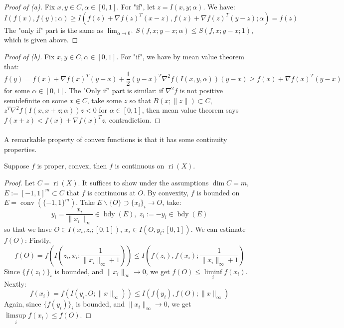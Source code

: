 \begin{proof}[Proof of (a)]
	Fix $x,y\in C,\alpha \in [0, 1]$. For "if", let $z=I(x,y; \alpha )$. We have:
	\[
		I(f(x),f(y);\alpha )  \geq I(f(z)+\nabla f(z)^T(x-z),f(z)+\nabla f(z)^T(y-z);\alpha ) = f(z)
	\]
	The "only if" part is the same as $\lim_{\alpha \to0^+}S(f,x; y-x; \alpha )\leq S(f,x; y-x; 1)$, which is given above.
\end{proof}
\begin{proof}[Proof of (b)]
	Fix $x,y\in C,\alpha \in [0, 1]$. For "if", we have by mean value theorem that:
	\[
		f(y)=f(x)+\nabla f(x)^T(y-x)+\frac{1}{2}(y-x)^T\nabla^2f(I(x,y,\alpha ))(y-x)\geq f(x)+\nabla f(x)^T(y-x)
	\]
	for some $\alpha \in[0,1]$. The "Only if" part is similar: if $\nabla^2 f$ is not positive semidefinite on some $x\in C$, take some $z$ so that $B(x;\|z\|)\subset C$, $z^T\nabla^2f(I(x, x+z;\alpha))z<0$ for $\alpha\in[0,1]$, then mean value theorem says $f(x+z)<f(x)+\nabla f(x)^Tz$, contradiction.
\end{proof}

\paragraph{}A remarkable property of convex functions is that it has some continuity properties.

\begin{prop}
	\label{prop:022-continuity}
	Suppose $f$ is proper, convex, then $f$ is continuous on $\operatorname{ri}(X)$.
\end{prop}

\begin{proof}
	Let $C=\operatorname{ri}(X)$. It suffices to show under the assumptions $\dim C=m$, $E:=[-1,1]^m\subset C$ that $f$ is continuous at $O$. By convexity, $f$ is bounded on $E=\operatorname{conv}(\{-1,1\}^m)$. Take $E\smallsetminus\{O\}\supset \{x_i\}_i\to O$, take:
	\[
		y_i=\frac{x_i}{\|x_i\|_\infty}\in \operatorname{bdy}(E),\;
		z_i:=-y_i\in \operatorname{bdy}(E)
	\]
	so that we have $O\in I(x_i,z_i;[0,1])$, $x_i\in I(O,y_i;[0,1])$. We can estimate $f(O)$: Firstly,
	\[
		f(O)=f\left(I\left(z_i,x_i;\frac{1}{\|x_i\|_\infty+1}\right)\right)\leq I\left(f(z_i),f(x_i);\frac{1}{\|x_i\|_\infty+1}\right)
	\]
	Since $\{f(z_i)\}_i$ is bounded, and $\|x_i\|_\infty\to0$, we get $f(O)\leq \underset{i}{\operatorname{liminf}}f(x_i)$. Nextly:
	\[
		f(x_i)=f(I(y_i, O;\|x\|_\infty))\leq I(f(y_i),f(O);\|x\|_\infty)
	\]
	Again, since $\{f(y_i)\}_i$ is bounded, and $\|x_i\|_\infty\to0$, we get $\underset{i}{\operatorname{limsup}}f(x_i)\leq f(O)$.
\end{proof}

